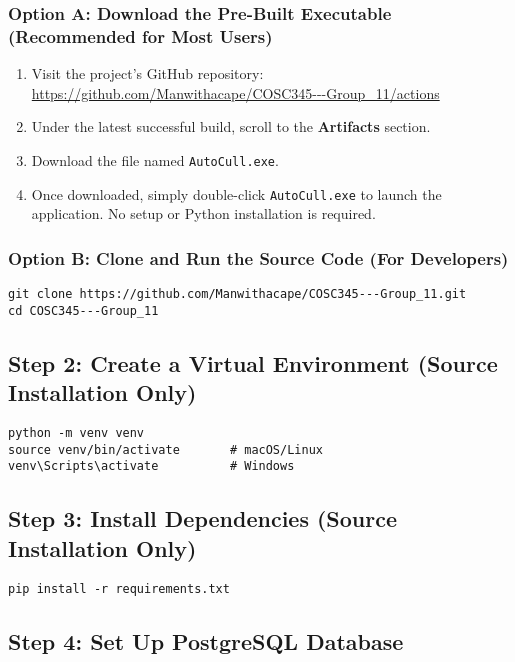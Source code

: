\documentclass[12pt,a4paper]{article}
\begin{document}
\subsubsection*{Option A: Download the Pre-Built Executable (Recommended for Most Users)}
\begin{enumerate}[label=\arabic*.]
    \item Visit the project's GitHub repository:  
    \url{https://github.com/Manwithacape/COSC345---Group_11/actions}
    \item Under the latest successful build, scroll to the \textbf{Artifacts} section.
    \item Download the file named \texttt{AutoCull.exe}.
    \item Once downloaded, simply double-click \texttt{AutoCull.exe} to launch the application.  
    No setup or Python installation is required.
\end{enumerate}

\subsubsection*{Option B: Clone and Run the Source Code (For Developers)}
\begin{lstlisting}[style=console]
git clone https://github.com/Manwithacape/COSC345---Group_11.git
cd COSC345---Group_11
\end{lstlisting}

\subsection{Step 2: Create a Virtual Environment (Source Installation Only)}
\begin{lstlisting}[style=console]
python -m venv venv
source venv/bin/activate       # macOS/Linux
venv\Scripts\activate          # Windows
\end{lstlisting}

\subsection{Step 3: Install Dependencies (Source Installation Only)}
\begin{lstlisting}[style=console]
pip install -r requirements.txt
\end{lstlisting}

\subsection{Step 4: Set Up PostgreSQL Database}
\end{document}
